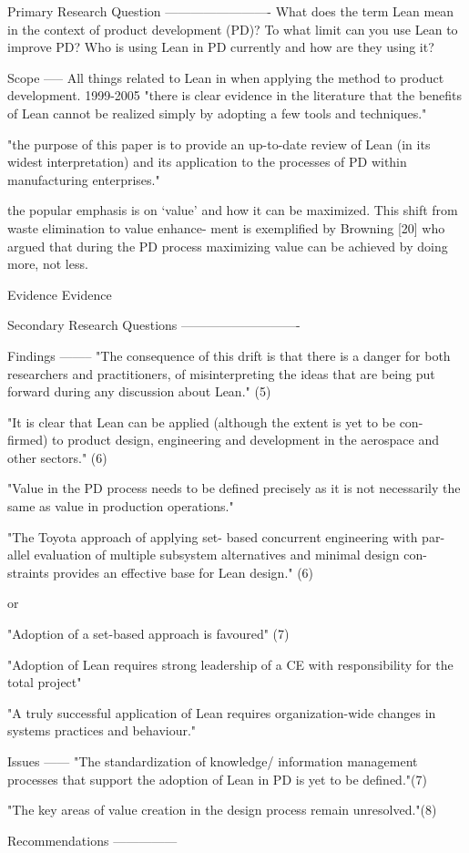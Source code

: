 Primary Research Question
-------------------------
What does the term Lean mean in the context of product development (PD)? To what limit can you use Lean to improve PD? Who is using Lean in PD currently and how are they using it?

Scope
-----
All things related to Lean in when applying the method to product development.
1999-2005
"there is clear evidence in the literature that
the benefits of Lean cannot be realized simply by
adopting a few tools and techniques."

"the purpose of this paper is to provide an up-to-date review of
Lean (in its widest interpretation) and its application
to the processes of PD within manufacturing
enterprises."

the popular emphasis is on ‘value’ and how it can be maximized.
This shift from waste elimination to value enhance-
ment is exemplified by Browning [20] who argued
that during the PD process maximizing value can
be achieved by doing more, not less.


Evidence 
Evidence

Secondary Research Questions
----------------------------

Findings
--------
"The consequence of this drift is that there is a
danger for both researchers and practitioners, of
misinterpreting the ideas that are being put forward
during any discussion about Lean." (5)

"It is clear that Lean can be applied
(although the extent is yet to be con-
firmed) to product design, engineering
and development in the aerospace and
other sectors." (6)

"Value in the PD process needs to be
defined precisely as it is not necessarily
the same as value in production
operations."

"The Toyota approach of applying set-
based concurrent engineering with par-
allel evaluation of multiple subsystem
alternatives and minimal design con-
straints provides an effective base for
Lean design." (6)

or

"Adoption of a set-based approach
is favoured" (7)

"Adoption of Lean requires strong
leadership of a CE with responsibility
for the total project"

"A truly successful application of Lean
requires organization-wide changes in
systems practices and behaviour."

Issues
------
"The standardization of knowledge/
information management processes that
support the adoption of Lean in PD is
yet to be defined."(7)

"The key areas of value creation in the design
process remain unresolved."(8)


Recommendations
---------------
